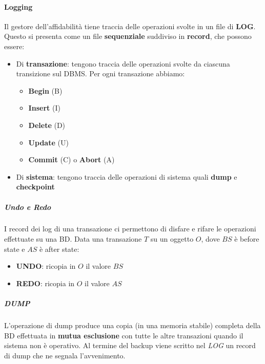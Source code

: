 \paragraph{Logging}
Il gestore dell'affidabilità tiene traccia delle operazioni svolte in un file di \textbf{LOG}. Questo si presenta come un file \textbf{sequenziale} suddiviso in \textbf{record}, che possono essere:
\begin{itemize}
	\item Di \textbf{transazione}: tengono traccia delle operazioni svolte da ciascuna transizione sul DBMS. Per ogni transazione abbiamo:
	\begin{itemize}
		\item \textbf{Begin} (B)
		\item \textbf{Insert} (I)
		\item \textbf{Delete} (D)
		\item \textbf{Update} (U)
		\item \textbf{Commit} (C) o \textbf{Abort} (A)
	\end{itemize}
	\item Di \textbf{sistema}: tengono traccia delle operazioni di sistema quali \textbf{dump} e \textbf{checkpoint}
\end{itemize}
\subparagraph{Undo e Redo}
I record dei log di una transazione ci permettono di disfare e rifare le operazioni effettuate su una BD. Data una transazione $T$ su un oggetto $O$, dove $BS$ è before state e $AS$ è after state:
\begin{itemize}
	\item \textbf{UNDO}: ricopia in $O$ il valore $BS$
	\item \textbf{REDO}: ricopia in $O$ il valore $AS$
\end{itemize} 
\subparagraph{DUMP}
L'operazione di dump produce una copia (in una memoria stabile) completa della BD effettuata in \textbf{mutua esclusione} con tutte le altre transazioni quando il sistema non è operativo. Al termine del backup viene scritto nel \textit{LOG} un record di dump che ne segnala l'avvenimento.

